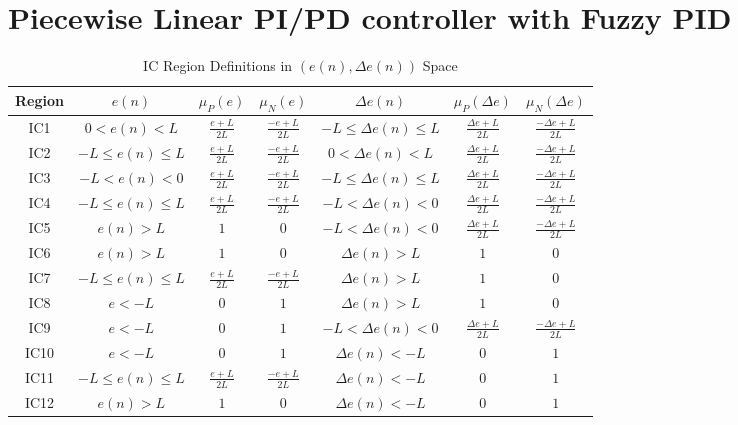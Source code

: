 \section{Piecewise Linear PI/PD controller with Fuzzy PID}
\begin{table}[h!]
\centering
\caption{IC Region Definitions in $(e(n), \Delta e(n))$ Space}
\begin{tabular}{c|ccc|ccc}
\toprule
Region & $e(n)$ & $\mu_P(e)$ & $\mu_N(e)$ &$\Delta e(n)$ & $\mu_P(\Delta e)$ & $\mu_N(\Delta e)$\\
\midrule
IC1 & $0<e(n)<L$ & $\frac{e+L}{2L}$ & $\frac{-e+L}{2L}$ & $-L\leq\Delta e(n)\leq L$ & $\frac{\Delta e+L}{2L}$ & $\frac{-\Delta e+L}{2L}$\\
IC2 & $-L\leq e(n)\leq L$ & $\frac{e+L}{2L}$ & $\frac{-e+L}{2L}$ & $0<\Delta e(n)<L$ & $\frac{\Delta e+L}{2L}$  & $\frac{-\Delta e+L}{2L}$\\
IC3 & $-L<e(n)<0$ & $\frac{e+L}{2L}$ & $\frac{-e+L}{2L}$ & $-L\leq\Delta e(n)\leq L$ & $\frac{\Delta e+L}{2L}$  & $\frac{-\Delta e+L}{2L}$\\
IC4 & $-L\leq e(n)\leq L$ & $\frac{e+L}{2L}$ & $\frac{-e+L}{2L}$ & $-L<\Delta e(n)<0$ & $\frac{\Delta e+L}{2L}$  & $\frac{-\Delta e+L}{2L}$\\
IC5 & $e(n)>L$ & $1$  & $0$ & $-L<\Delta e(n)<0$ & $\frac{\Delta e+L}{2L}$  & $\frac{-\Delta e+L}{2L}$\\
IC6 & $e(n)>L$ & $1$ & $0$ & $\Delta e(n)>L$ & $1$ & $0$\\
IC7 & $-L\leq e(n)\leq L$ & $\frac{e+L}{2L}$  & $\frac{-e+L}{2L}$ & $\Delta e(n)>L$ & $1$ & $0$\\
IC8 & $e<-L$ & $0$ & $1$ & $\Delta e(n)>L$ & $1$ & $0$\\
IC9 & $e<-L$ & $0$& $1$   & $-L<\Delta e(n)<0$ & $\frac{\Delta e+L}{2L}$ & $\frac{-\Delta e+L}{2L}$\\
IC10 & $e<-L$ & $0$& $1$   & $\Delta e(n)<-L$ & $0$ & $1$\\
IC11 & $-L\leq e(n)\leq L$ & $\frac{e+L}{2L}$  & $\frac{-e+L}{2L}$  & $\Delta e(n)<-L$ & $0$ & $1$\\
IC12 & $e(n)>L$ & $1$ & $0$ & $\Delta e(n)<-L$ & $0$ & $1$\\
\bottomrule
\end{tabular}
\end{table}

